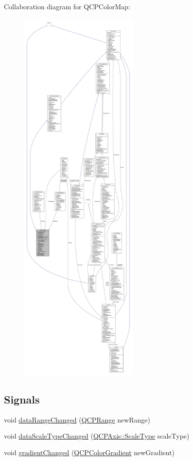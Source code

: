 Collaboration diagram for Q\+C\+P\+Color\+Map\+:\nopagebreak
\begin{figure}[H]
\begin{center}
\leavevmode
\includegraphics[height=550pt]{class_q_c_p_color_map__coll__graph}
\end{center}
\end{figure}
\subsection*{Signals}
\begin{DoxyCompactItemize}
\item 
void \hyperlink{class_q_c_p_color_map_a482980f2335d09cfb36dd95ba9663197}{data\+Range\+Changed} (\hyperlink{class_q_c_p_range}{Q\+C\+P\+Range} new\+Range)
\item 
void \hyperlink{class_q_c_p_color_map_a978d5d5c9f68cffef8c902b855c04490}{data\+Scale\+Type\+Changed} (\hyperlink{class_q_c_p_axis_a36d8e8658dbaa179bf2aeb973db2d6f0}{Q\+C\+P\+Axis\+::\+Scale\+Type} scale\+Type)
\item 
void \hyperlink{class_q_c_p_color_map_abf4797f86e422ac6e0f732c4ff1a4d49}{gradient\+Changed} (\hyperlink{class_q_c_p_color_gradient}{Q\+C\+P\+Color\+Gradient} new\+Gradient)
\end{DoxyCompactItemize}
